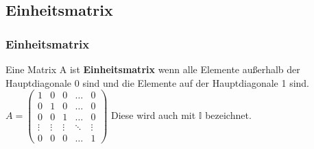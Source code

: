\subsection{Einheitsmatrix}
\begin{frame}
\frametitle{Einheitsmatrix}
Eine Matrix A ist \textbf{Einheitsmatrix} wenn alle Elemente außerhalb der Hauptdiagonale 0 sind und die Elemente auf der Hauptdiagonale 1 sind.\\
$A = \begin{pmatrix}
1 & 0 & 0 & \dots & 0\\
0 & 1 & 0 & \dots & 0\\
0 & 0 & 1 & \dots & 0\\
\vdots & \vdots & \vdots & \ddots & \vdots\\
0 & 0 & 0 & \dots & 1
\end{pmatrix}$
Diese wird auch mit $\mathbb{I}$ bezeichnet.
\end{frame}
